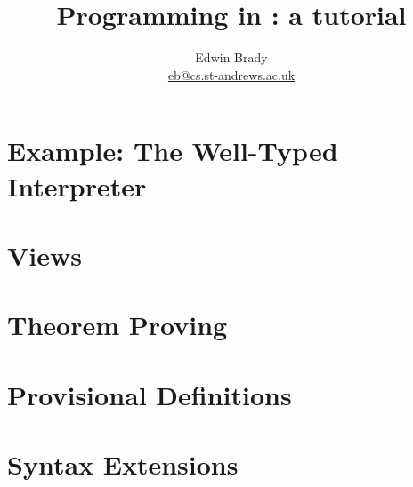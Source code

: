\documentclass{article}
\title{Programming in \Idris{}: a tutorial}
\author{Edwin Brady \\ \url{eb@cs.st-andrews.ac.uk}}
\begin{document}
\maketitle









\section{Example: The Well-Typed Interpreter}
\section{Views}
\section{Theorem Proving}
\section{Provisional Definitions}
\section{Syntax Extensions}





\end{document}
